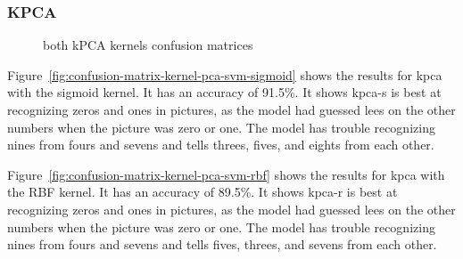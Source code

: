 \subsubsection{KPCA}
\begin{figure}
    \centering
    \qquad
    \caption{both kPCA kernels confusion matrices}
    \label{fig:kpca-kernels}
\end{figure}

Figure~\ref{fig:confusion-matrix-kernel-pca-svm-sigmoid} shows the results for \gls{kpca} with the sigmoid kernel. It has an accuracy of 91.5\%. It shows \gls{kpca-s} is best at recognizing zeros and ones in pictures, as the model had guessed lees on the other numbers when the picture was zero or one. The model has trouble recognizing nines from fours and sevens and tells threes, fives, and eights from each other. 

Figure~\ref{fig:confusion-matrix-kernel-pca-svm-rbf} shows the results for \gls{kpca} with the RBF kernel. It has an accuracy of 89.5\%. It shows \gls{kpca-r} is best at recognizing zeros and ones in pictures, as the model had guessed lees on the other numbers when the picture was zero or one. The model has trouble recognizing nines from fours and sevens and tells fives, threes, and sevens from each other.  

